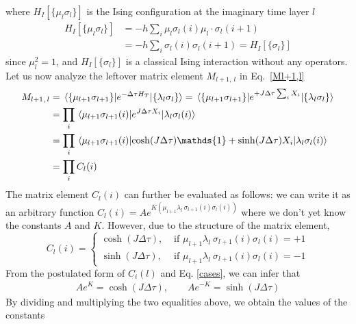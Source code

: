 \documentclass[../thesis_main.tex]{subfiles}
\begin{document}
\endgroup
where $H_I[\{\mu_l \sigma_l\}]$ is the Ising configuration at the imaginary time layer $l$  
\begingroup
\allowdisplaybreaks
\begin{align}
    H_I[\{\mu_l \sigma_l\}] &= -h \sum_i \mu_l \sigma_l(i) \mu_l \cdot \sigma_l (i+1) \nonumber \\
    &= -h \sum_i \sigma_l(i) \sigma_l (i+1) = H_I[\{\sigma_l\}]
    \label{isingterm}
\end{align}
\endgroup
since $\mu_l^2 = 1$, and $H_I[\{\sigma_l\}]$ is a classical Ising interaction without any operators. Let us now analyze the leftover matrix element $M_{l+1, \:l}$ in Eq.~\eqref{Ml+1,l}
\begingroup
\allowdisplaybreaks
\begin{align}
    M_{l+1, \: l} &= \mel{\{\mu_{l+1} \sigma_{l+1}\}}{e^{-\Delta \tau H_T}}{\{\lambda_l \sigma_l\}} = \mel{\{\mu_{l+1} \sigma_{l+1}\}}{e^{+ J\Delta \tau \sum_{i} X_i}}{\{\lambda_l \sigma_l\}} \nonumber \\
    & = \prod_{i} \mel{\mu_{l+1} \sigma_{l+1}(i)}{e^{J \Delta \tau X_i}}{\lambda_{l} \sigma_l(i)} \nonumber \\
    & = \prod_{i} \mel{\mu_{l+1} \sigma_{l+1}(i)}{\cosh(J \Delta \tau) \mathds{1} + \sinh(J \Delta \tau)X_i }{\lambda_{l} \sigma_l(i)} \nonumber \\
    & = \prod_{i} C_l(i)
    \label{matrixelement}
\end{align}
\endgroup
The matrix element $C_l(i)$ can further be evaluated as follows: we can write it as an arbitrary function $C_l(i) = A e^{K(\mu_{l+1}\lambda_l \: \sigma_{l+1}(i)\sigma_{l}(i))}$ where we don't yet know the constants $A$ and $K$. However, due to the structure of the matrix element,
\begin{equation}
    C_l(i) = 
    \begin{cases}
    \cosh(J \Delta \tau), & \text{ if } \mu_{l+1}\lambda_l \: \sigma_{l+1}(i)\sigma_{l}(i) = +1 \\
    \sinh(J \Delta \tau), & \text{ if } \mu_{l+1}\lambda_l \: \sigma_{l+1}(i)\sigma_{l}(i) = -1       
    \end{cases}
    \label{cases}
\end{equation}
From the postulated form of $C_i(l)$ and Eq. \eqref{cases}, we can infer that 
\begingroup
\allowdisplaybreaks
\begin{align}
A e^{K} = \cosh(J \Delta \tau), \qquad A e^{-K} = \sinh(J \Delta \tau)
\end{align}
\endgroup
By dividing and multiplying the two equalities above, we obtain the values of the constants
\end{document}
